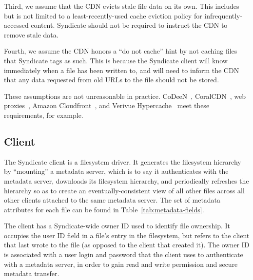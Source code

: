 Third, we assume that the CDN evicts stale file data on its own. This
includes but is not limited to a least-recently-used cache eviction
policy for infrequently-accessed content.  Syndicate should not be
required to instruct the CDN to remove stale data.

Fourth, we assume the CDN honors a ``do not cache'' hint by not
caching files that Syndicate tags as such.  This is because the
Syndicate client will know immediately when a file has been written
to, and will need to inform the CDN that any data requested from old
URLs to the file should not be stored.

These assumptions are not unreasonable in practice.  CoDeeN~\cite{codeen}, CoralCDN~\cite{coralcdn},
web proxies~\cite{squid}, Amazon Cloudfront~\cite{cloudfront}, and Verivue Hypercache~\cite{vcoblitz} meet
these requirements, for example.


\subsection{Client}

The Syndicate client is a filesystem driver.  It generates the
filesystem hierarchy by ``mounting'' a metadata server, which is to say
it authenticates with the metadata server, downloads its filesystem
hierarchy, and periodically refreshes the hierarchy so as to create an
eventually-consistent view of all other files across all other clients
attached to the same metadata server.  The set of metadata attributes
for each file can be found in Table~\ref{tab:metadata-fields}.

The client has a Syndicate-wide owner ID used to identify file
ownership.  It occupies the user ID field in a file's entry in the filesystem, but refers
to the client that last wrote to the file (as opposed to the client
that created it).  The owner ID is associated with a user login and
password that the client uses to authenticate with a metadata server,
in order to gain read and write permission and secure metadata
transfer.

